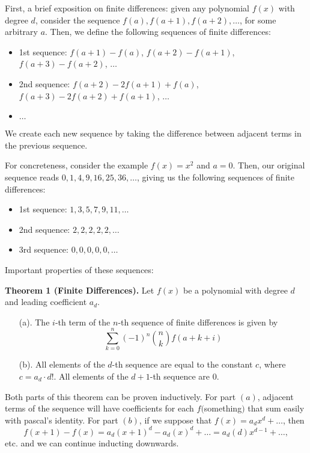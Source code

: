 
First, a brief exposition on finite differences: given any polynomial $f(x)$ with degree $d$, consider the sequence $f(a), f(a+1), f(a+2), \hdots$, for some arbitrary $a$. Then, we define the following sequences of finite differences: 
\begin{itemize}
    \item 1st sequence: $f(a+1)-f(a)$, $f(a+2)-f(a+1)$, $f(a+3)-f(a+2)$, $\hdots$ 
    \item 2nd sequence: $f(a+2)-2f(a+1)+f(a)$, $f(a+3)-2f(a+2)+f(a+1)$, $\hdots$
    \item $\hdots$ 
\end{itemize}
We create each new sequence by taking the difference between adjacent terms in the previous sequence.\V

For concreteness, consider the example $f(x) = x^2$ and $a=0$. Then, our original sequence reads $0, 1, 4, 9, 16, 25, 36, \hdots$, giving us the following sequences of finite differences: 
\begin{itemize}
    \item 1st sequence: $1, 3, 5, 7, 9, 11, \hdots$
    \item 2nd sequence: $2, 2, 2, 2, 2, \hdots$
    \item 3rd sequence: $0, 0, 0, 0, 0, \hdots$
\end{itemize}

Important properties of these sequences:
\begin{theorem}
\textbf{Theorem 1 (Finite Differences).} Let $f(x)$ be a polynomial with degree $d$ and leading coefficient $a_d$.  

\begin{enumerate}
    \item [(a).] The $i$-th term of the $n$-th sequence of finite differences is given by \[\sum_{k=0}^{n}(-1)^n\binom{n}{k}f(a+k+i)\]
    \item [(b).] All elements of the $d$-th sequence are equal to the constant $c$, where $c = a_d\cdot d!$. All elements of the $d+1$-th sequence are $0$. 
\end{enumerate}
\end{theorem}\V

Both parts of this theorem can be proven inductively. For part $(a)$, adjacent terms of the sequence will have coefficients for each $f($something$)$ that sum easily with pascal's identity. For part $(b)$, if we suppose that $f(x) = a_dx^d+\hdots$, then 
\[f(x+1)-f(x) = a_d(x+1)^d - a_d(x)^d + \hdots = a_d(d)x^{d-1}+\hdots,\]
etc. and we can continue inducting downwards. \V

